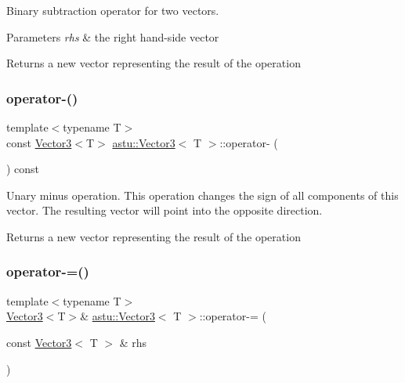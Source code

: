 Binary subtraction operator for two vectors.


\begin{DoxyParams}{Parameters}
{\em rhs} & the right hand-\/side vector \\
\hline
\end{DoxyParams}
\begin{DoxyReturn}{Returns}
a new vector representing the result of the operation 
\end{DoxyReturn}
\mbox{\label{classastu_1_1Vector3_aae482f77db8c14915f9757f73bcd45d0}} 
\subsubsection{\texorpdfstring{operator-\/()}{operator-()}\hspace{0.1cm}{\footnotesize\ttfamily [2/2]}}
{\footnotesize\ttfamily template$<$typename T$>$ \\
const \hyperlink{classastu_1_1Vector3}{Vector3}$<$T$>$ \hyperlink{classastu_1_1Vector3}{astu\+::\+Vector3}$<$ T $>$\+::operator-\/ (\begin{DoxyParamCaption}{ }\end{DoxyParamCaption}) const\hspace{0.3cm}{\ttfamily [inline]}}

Unary minus operation. This operation changes the sign of all components of this vector. The resulting vector will point into the opposite direction.

\begin{DoxyReturn}{Returns}
a new vector representing the result of the operation 
\end{DoxyReturn}
\mbox{\label{classastu_1_1Vector3_ae1d173eae2ddeb23fe18794233bed63d}} 
\subsubsection{\texorpdfstring{operator-\/=()}{operator-=()}}
{\footnotesize\ttfamily template$<$typename T$>$ \\
\hyperlink{classastu_1_1Vector3}{Vector3}$<$T$>$\& \hyperlink{classastu_1_1Vector3}{astu\+::\+Vector3}$<$ T $>$\+::operator-\/= (\begin{DoxyParamCaption}\item[{const \hyperlink{classastu_1_1Vector3}{Vector3}$<$ T $>$ \&}]{rhs }\end{DoxyParamCaption})\hspace{0.3cm}{\ttfamily [inline]}}

